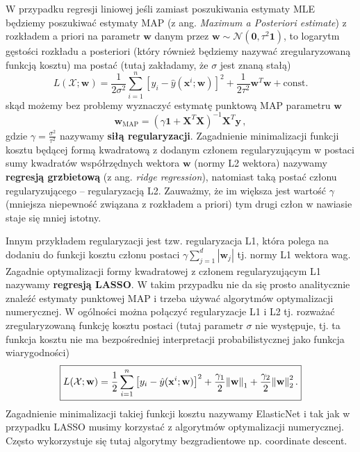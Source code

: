 \documentclass{myclass}
\numberwithin{equation}{section}
\begin{document}
W przypadku regresji liniowej jeśli zamiast poszukiwania estymaty MLE będziemy poszukiwać estymaty
MAP (z ang. \textit{Maximum a Posteriori estimate}) z rozkładem a priori na parametr \(\mathbf{w}\)
danym przez \(\mathbf{w} \sim \mathcal{N}(\mathbf{0}, \tau^{2}\mathbf{1})\), to logarytm gęstości
rozkładu a posteriori (który również będziemy nazywać zregularyzowaną funkcją kosztu) ma postać
(tutaj zakładamy, że \(\sigma\) jest znaną stałą)
\begin{equation}\boxed{
    L(\mathcal{X};\mathbf{w}) = \frac{1}{2\sigma^2}\sum_{i=1}^n\left[y_i - \hat{y}(\mathbf{x}^i;\mathbf{w})\right]^2 + \frac{1}{2\tau^2}\mathbf{w}^T\mathbf{w} + \mathrm{const.}
}\end{equation}
skąd możemy bez problemy wyznaczyć estymatę punktową MAP parametru \(\mathbf{w}\)
\begin{equation}
    \mathbf{w}_\mathrm{MAP} = \left(\gamma \mathbf{1} + \mathbf{X}^T\mathbf{X}\right)^{-1}\mathbf{X}^T\mathbf{y}\,,
\end{equation}
gdzie \(\gamma = \frac{\sigma^2}{\tau^2}\) nazywamy \textbf{siłą regularyzacji}. Zagadnienie
minimalizacji funkcji kosztu będącej formą kwadratową z dodanym członem regularyzującym w postaci
sumy kwadratów współrzędnych wektora \(\mathbf{w}\) (normy L2 wektora) nazywamy \textbf{regresją
grzbietową} (z ang. \textit{ridge regression}), natomiast taką postać członu regularyzującego --
regularyzacją L2. Zauważmy, że im większa jest wartość \(\gamma\) (mniejsza niepewność związana z
rozkładem a priori) tym drugi człon w nawiasie staje się mniej istotny.

Innym przykładem regularyzacji jest tzw. regularyzacja L1, która polega na dodaniu do funkcji kosztu
członu postaci \(\gamma \sum_{j=1}^d |\mathbf{w}_j|\) tj. normy L1 wektora wag. Zagadnie
optymalizacji formy kwadratowej z członem regularyzującym L1 nazywamy \textbf{regresją LASSO}. W
takim przypadku nie da się prosto analitycznie znaleźć estymaty punktowej MAP i trzeba używać
algorytmów optymalizacji numerycznej. W ogólności można połączyć regularyzacje L1 i L2 tj. rozważać
zregularyzowaną funkcję kosztu postaci (tutaj parametr \(\sigma\) nie występuje, tj. ta funkcja
kosztu nie ma bezpośredniej interpretacji probabilistycznej jako funkcja wiarygodności)
\begin{equation}\boxed{
    L(\mathcal{X};\mathbf{w}) = \frac{1}{2}\sum_{i=1}^n \left[y_i - \hat{y}(\mathbf{x}^i;\mathbf{w})\right]^2 + \frac{\gamma_1}{2}\norm{\mathbf{w}}_1 +  \frac{\gamma_2}{2}\norm{\mathbf{w}}_2^2\,.
}\end{equation}
Zagadnienie minimalizacji takiej funkcji kosztu nazywamy ElasticNet i tak jak w przypadku LASSO
musimy korzystać z algorytmów optymalizacji numerycznej. Często wykorzystuje się tutaj algorytmy
bezgradientowe np. coordinate descent.
\end{document}
